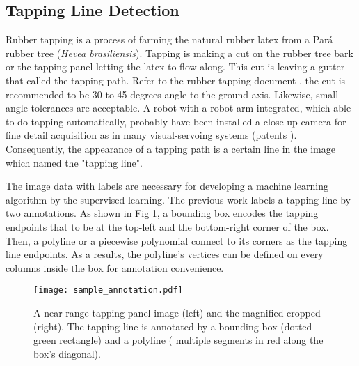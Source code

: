 \documentclass[default,pdflatex,iicol]{sn-jnl}%
\begin{document}
\subsection{Tapping Line Detection}
Rubber tapping is a process of farming the natural rubber latex from a Pará rubber tree (\textit{Hevea brasiliensis}). Tapping is making a cut on the rubber tree bark or the tapping panel letting the latex to flow along. This cut is leaving a gutter that called the tapping path. Refer to the rubber tapping document \cite{abraham1992tapping}, the cut is recommended to be 30 to 45 degrees angle to the ground axis. Likewise, small angle tolerances are acceptable. A robot with a robot arm integrated, which able to do tapping automatically, probably have been installed a close-up camera for fine detail acquisition as in many visual-servoing systems (patents \cite{patent1, patent2, patent3}). Consequently, the appearance of a tapping path is a certain line in the image which named the "tapping line".

The image data with labels are necessary for developing a machine learning algorithm by the supervised learning. The previous work \cite{Wongtanawijit_2021} labels a tapping line by two annotations. As shown in Fig \ref{fig-sampleannotation}, a bounding box encodes the tapping endpoints that to be at the top-left and the bottom-right corner of the box. Then, a polyline or a piecewise polynomial connect to its corners as the tapping line endpoints. As a results, the polyline's vertices can be defined on every columns inside the box for annotation convenience.

\begin{figure}[h]%
\centering
\texttt{[image: sample\_annotation.pdf]}
\caption{A near-range tapping panel image (left) and the magnified cropped (right). The tapping line is annotated by a bounding box (dotted green rectangle) and a polyline ( multiple segments in red along the box's diagonal).}\label{fig-sampleannotation}
\end{figure}
\end{document}
